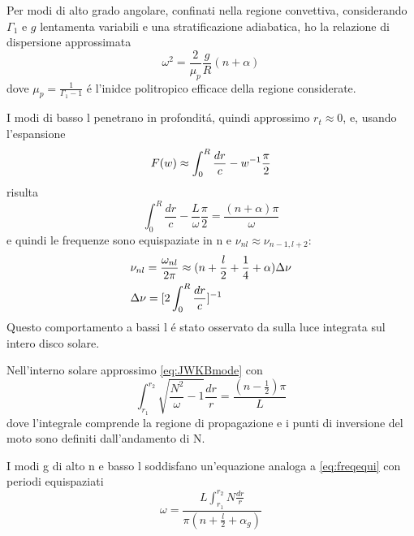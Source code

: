\documentclass[../main.tex]{subfiles}
\begin{document}
Per modi di alto grado angolare, confinati nella regione convettiva, considerando $\Gamma_1$ e $g$ lentamenta variabili e una stratificazione adiabatica, ho la relazione di dispersione approssimata
\begin{equation}
\omega^2=\frac{2}{\mu_p}\frac{g}{R}(n+\alpha)
\end{equation}
dove $\mu_p=\frac{1}{\Gamma_1-1}$ \'e l'inidce politropico efficace della regione considerate. 

I modi di basso l penetrano in profondit\'a, quindi approssimo $r_t\approx0$, e, usando l'espansione
\begin{equation}
F(w)\approx\int_0^R\frac{dr}{c}-w^{-1}\frac{\pi}{2}
\end{equation}
 risulta
\begin{equation}
\int_0^R\frac{dr}{c}-\frac{L}{\omega}\frac{\pi}{2}=\frac{(n+\alpha)\pi}{\omega}
\end{equation}
e quindi le  frequenze sono equispaziate in n e $\nu_{nl}\approx\nu_{n-1,l+2}$:
\begin{align}
&\nu_{nl}=\frac{\omega_{nl}}{2\pi}\approx(n+\frac{l}{2}+\frac{1}{4}+\alpha)\Delta\nu\label{eq:freqequi}\\
&\Delta\nu=[2\int_0^R\frac{dr}{c}]^{-1}
\end{align}
Questo comportamento a bassi l \'e stato osservato da \cite{cla79solar} sulla luce integrata sul intero disco solare.


Nell'interno solare approssimo \eqref{eq:JWKBmode} con
\begin{equation}
\int_{r_1}^{r_2}\sqrt{\frac{N^2}{\omega}-1}\frac{dr}{r}=\frac{(n-\frac{1}{2})\pi}{L}
\end{equation}
dove l'integrale comprende la regione di propagazione e i punti di inversione del moto sono definiti dall'andamento di N.

I modi g di alto n e basso l soddisfano un'equazione analoga a \eqref{eq:freqequi} con periodi equispaziati
\begin{equation}
\omega=\frac{L\int_{r_1}^{r_2}N\frac{dr}{r}}{\pi(n+\frac{l}{2}+\alpha_g)}
\end{equation}


%
\end{document}
